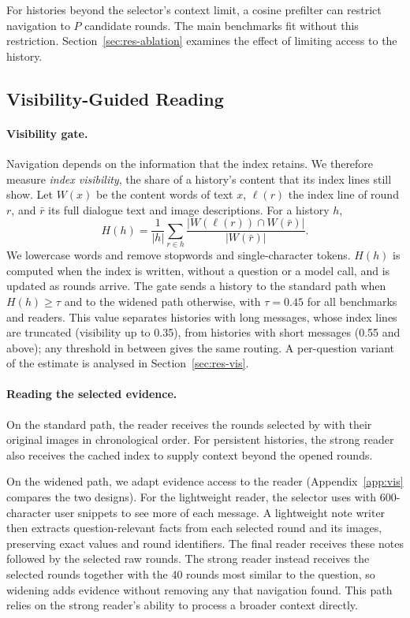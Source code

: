 For histories beyond the selector's context limit, a cosine prefilter can restrict navigation to $P$ candidate rounds. The main benchmarks fit without this restriction. Section~\ref{sec:res-ablation} examines the effect of limiting access to the history.

\subsection{Visibility-Guided Reading}
\label{sec:gate}

\paragraph{Visibility gate.} Navigation depends on the information that the index retains. We therefore measure \emph{index visibility}, the share of a history's content that its index lines still show. Let $W(x)$ be the content words of text $x$, $\ell(r)$ the index line of round $r$, and $\bar r$ its full dialogue text and image descriptions. For a history $h$,
\begin{equation}
H(h)=\frac{1}{|h|}\sum_{r\in h}\frac{|W(\ell(r))\cap W(\bar r)|}{|W(\bar r)|}.
\label{eq:vis}
\end{equation}
We lowercase words and remove stopwords and single-character tokens. $H(h)$ is computed when the index is written, without a question or a model call, and is updated as rounds arrive. The gate sends a history to the standard path when $H(h)\ge\tau$ and to the widened path otherwise, with $\tau{=}0.45$ for all benchmarks and readers. This value separates histories with long messages, whose index lines are truncated (visibility up to 0.35), from histories with short messages (0.55 and above); any threshold in between gives the same routing. A per-question variant of the estimate is analysed in Section~\ref{sec:res-vis}.

\paragraph{Reading the selected evidence.}
\label{sec:read}
On the standard path, the reader receives the rounds selected by \qss{} with their original images in chronological order. For persistent histories, the strong reader also receives the cached index to supply context beyond the opened rounds.

On the widened path, we adapt evidence access to the reader (Appendix~\ref{app:vis} compares the two designs). For the lightweight reader, the selector uses \qss{} with 600-character user snippets to see more of each message. A lightweight note writer then extracts question-relevant facts from each selected round and its images, preserving exact values and round identifiers. The final reader receives these notes followed by the selected raw rounds. The strong reader instead receives the selected rounds together with the 40 rounds most similar to the question, so widening adds evidence without removing any that navigation found. This path relies on the strong reader's ability to process a broader context directly.

